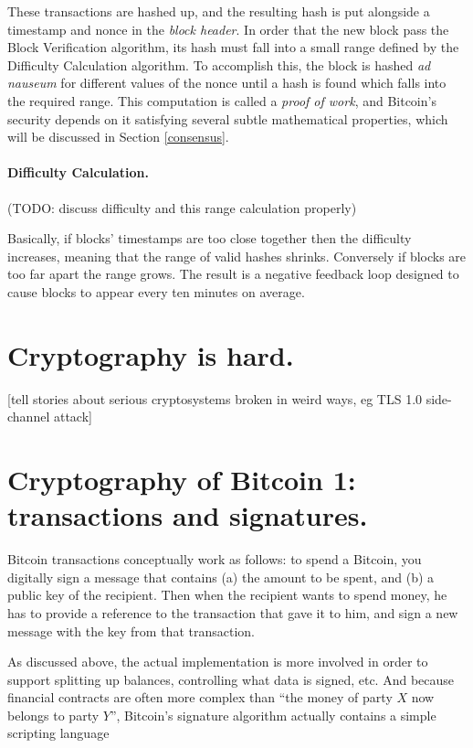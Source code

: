 \documentclass[letterpaper]{article}
\begin{document}
These transactions are hashed up, and the resulting hash is put
alongside a timestamp and nonce in the \emph{block header}. In order
that the new block pass the Block Verification algorithm, its hash must
fall into a small range defined by the Difficulty Calculation algorithm.
To accomplish this, the block is hashed \emph{ad nauseum} for different
values of the nonce until a hash is found which falls into the required
range. This computation is called a \emph{proof of work}, and Bitcoin's
security depends on it satisfying several subtle mathematical properties,
which will be discussed in Section \ref{consensus}.

\paragraph{Difficulty Calculation.}
(TODO: discuss difficulty and this range calculation properly)

Basically, if blocks' timestamps are too close together then the difficulty
increases, meaning that the range of valid hashes shrinks. Conversely if
blocks are too far apart the range grows. The result is a negative feedback
loop designed to cause blocks to appear every ten minutes on average.

\section{Cryptography is hard.}

[tell stories about serious cryptosystems broken in weird ways, eg TLS 1.0 side-channel attack]

\section{Cryptography of Bitcoin 1: transactions and signatures. \label{txes}}

Bitcoin transactions conceptually work as follows: to spend a Bitcoin, you
digitally sign a message that contains (a) the amount to be spent, and (b)
a public key of the recipient. Then when the recipient wants to spend money,
he has to provide a reference to the transaction that gave it to him, and
sign a new message with the key from that transaction.

As discussed above, the actual implementation is more involved in order to
support splitting up balances, controlling what data is signed, etc. And
because financial contracts are often more complex than ``the money of
party $X$ now belongs to party $Y$'', Bitcoin's signature algorithm actually
contains a simple scripting language
\end{document}
